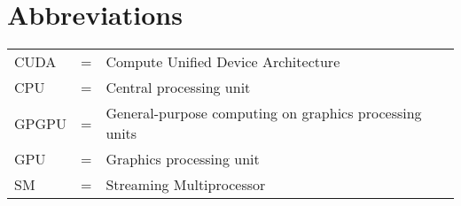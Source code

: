 
\section*{{\Huge Abbreviations}}
\vspace{1 cm}

\noindent
\begin{center}
\begin{tabular}{ l c l }
   CUDA & = & Compute Unified Device Architecture \\
   CPU & = & Central processing unit \\
   GPGPU & = & General-purpose computing on graphics processing units \\
   GPU & = & Graphics processing unit \\
   SM & = & Streaming Multiprocessor \\
\end{tabular}
\end{center}

\cleardoublepage

\pagestyle{fancy}
\fancyhf{}
\renewcommand{\chaptermark}[1]{\markboth{\chaptername\ \thechapter.\ #1}{}}
\renewcommand{\sectionmark}[1]{\markright{\thesection\ #1}}
\renewcommand{\headrulewidth}{0.1ex}
\renewcommand{\footrulewidth}{0.1ex}
\fancyfoot[LE,RO]{\thepage}
\fancyhead[LE]{\leftmark}
\fancyhead[RO]{\rightmark}
\fancypagestyle{plain}{\fancyhf{}\fancyfoot[LE,RO]{\thepage}\renewcommand{\headrulewidth}{0ex}}

\setcounter{page}{1}
